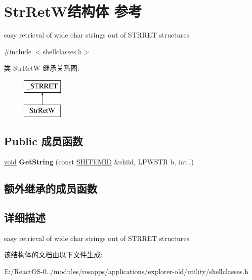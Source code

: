 \hypertarget{struct_str_ret_w}{}\section{Str\+Ret\+W结构体 参考}
\label{struct_str_ret_w}


easy retrieval of wide char strings out of S\+T\+R\+R\+ET structures  




{\ttfamily \#include $<$shellclasses.\+h$>$}

类 Str\+RetW 继承关系图\+:\begin{figure}[H]
\begin{center}
\leavevmode
\includegraphics[height=2.000000cm]{struct_str_ret_w}
\end{center}
\end{figure}
\subsection*{Public 成员函数}
\begin{DoxyCompactItemize}
\item 
\mbox{\label{struct_str_ret_w_a405d0e16a94f0d7f0f6a39d47525380a}} 
\hyperlink{interfacevoid}{void} {\bfseries Get\+String} (const \hyperlink{struct_s_h_i_t_e_m_i_d}{S\+H\+I\+T\+E\+M\+ID} \&shiid, L\+P\+W\+S\+TR b, int l)
\end{DoxyCompactItemize}
\subsection*{额外继承的成员函数}


\subsection{详细描述}
easy retrieval of wide char strings out of S\+T\+R\+R\+ET structures 

该结构体的文档由以下文件生成\+:\begin{DoxyCompactItemize}
\item 
E\+:/\+React\+O\+S-\/0../modules/rosapps/applications/explorer-\/old/utility/shellclasses.\+h\end{DoxyCompactItemize}
